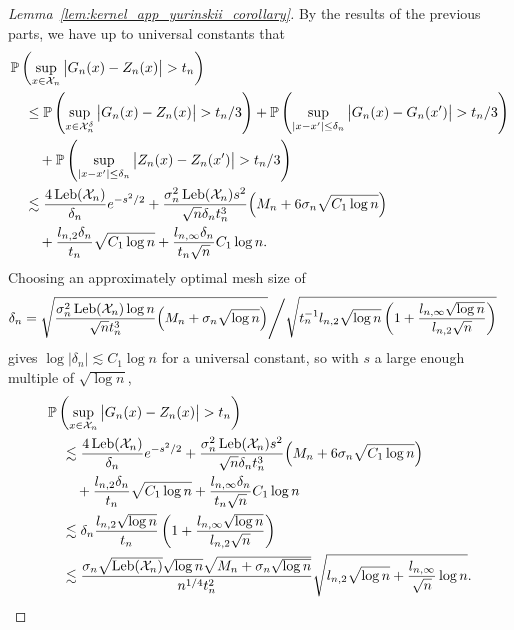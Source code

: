 \begin{proof}[Lemma~\ref{lem:kernel_app_yurinskii_corollary}]
  By the results of the previous parts,
  we have up to universal constants that
  \begin{align*}
    &\mathbb{P}\left(
      \sup_{x \in \mathcal{X}_n}
      \big|
      G_n(x) - Z_n(x)
      \big|
      > t_n
    \right) \\
    &\quad\leq
    \mathbb{P}\left(
      \sup_{x \in \mathcal{X}_n^\delta}
      \big|
      G_n(x) - Z_n(x)
      \big|
      > t_n / 3
    \right)
    + \mathbb{P}\left(
      \sup_{|x-x'| \leq \delta_n}
      \big|
      G_n(x) - G_n(x')
      \big|
      > t_n / 3
    \right) \\
    &\qquad+
    \mathbb{P}\left(
      \sup_{|x - x'| \leq \delta_n}
      \big|
      Z_n(x) - Z_n(x')
      \big|
      > t_n / 3
    \right) \\
    &\quad\lesssim
    \frac{4 \operatorname{Leb}(\mathcal{X}_n)}{\delta_n}
    e^{-s^2/2}
    + \frac{\sigma_n^2 \operatorname{Leb}(\mathcal{X}_n) s^2}{\sqrt n \delta_n t_n^3}
    \Big(M_n + 6 \sigma_n \sqrt{C_1 \log n}\Big) \\
    &\qquad+
    \frac{l_{n,2} \delta_n}{t_n}
    \sqrt{C_1 \log n}
    + \frac{l_{n,\infty} \delta_n}{t_n \sqrt n} C_1 \log n.
  \end{align*}
  Choosing an approximately optimal mesh size of
  \begin{align*}
    \delta_n
    &=
    \sqrt{
      \frac{\sigma_n^2 \operatorname{Leb}(\mathcal{X}_n) \log n}{\sqrt n t_n^3}
      \Big(M_n + \sigma_n \sqrt{\log n}\Big)
    } \Bigg/
    \sqrt{
      t_n^{-1}
      l_{n,2}
      \sqrt{\log n}
      \left(
        1 + \frac{l_{n,\infty} \sqrt{\log n}}{l_{n,2} \sqrt{n}}
      \right)
    }
  \end{align*}
  gives $\log |\delta_n| \lesssim C_1 \log n$ for a universal constant,
  so with $s$ a large enough multiple of $\sqrt{\log n}$,
  \begin{align*}
    &\mathbb{P}\left(
      \sup_{x \in \mathcal{X}_n}
      \big|
      G_n(x) - Z_n(x)
      \big|
      > t_n
    \right) \\
    &\quad\lesssim
    \frac{4 \operatorname{Leb}(\mathcal{X}_n)}{\delta_n}
    e^{-s^2/2}
    + \frac{\sigma_n^2 \operatorname{Leb}(\mathcal{X}_n) s^2}{\sqrt n \delta_n t_n^3}
    \Big(M_n + 6 \sigma_n \sqrt{C_1 \log n}\Big) \\
    &\qquad+
    \frac{l_{n,2} \delta_n}{t_n}
    \sqrt{C_1 \log n}
    + \frac{l_{n,\infty} \delta_n}{t_n \sqrt n} C_1 \log n \\
    &\quad\lesssim
    \delta_n
    \frac{l_{n,2} \sqrt {\log n}}{t_n}
    \left( 1 + \frac{l_{n,\infty} \sqrt{\log n}}{l_{n,2} \sqrt n} \right) \\
    &\quad\lesssim
    \frac{\sigma_n \sqrt{\operatorname{Leb}(\mathcal{X}_n)} \sqrt{\log n}
    \sqrt{M_n + \sigma_n \sqrt{\log n}}}
    {n^{1/4} t_n^2}
    \sqrt{l_{n,2} \sqrt {\log n}
    + \frac{l_{n,\infty}}{\sqrt n} \log n}.
  \end{align*}
\end{proof}

